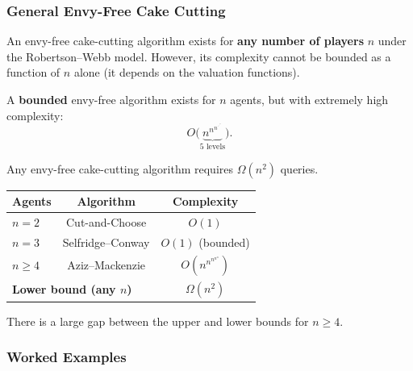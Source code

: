 \separator

\subsubsection{General Envy-Free Cake Cutting}

\begin{thmbox}
An envy-free cake-cutting algorithm exists for \textbf{any number of players} $n$ under the Robertson--Webb model. However, its complexity cannot be bounded as a function of $n$ alone (it depends on the valuation functions).
\end{thmbox}

\begin{thmbox}
A \textbf{bounded} envy-free algorithm exists for $n$ agents, but with extremely high complexity:
\[
  O\!\bigl(\underbrace{n^{n^{n^{\cdot^{\cdot^{\cdot^n}}}}}}_{5 \text{ levels}}\bigr).
\]
\end{thmbox}

\begin{thmbox}
Any envy-free cake-cutting algorithm requires $\Omega(n^2)$ queries.
\end{thmbox}

\begin{tipbox}
\begin{center}
\begin{tabular}{lcc}
\toprule
\textbf{Agents} & \textbf{Algorithm} & \textbf{Complexity} \\
\midrule
$n = 2$ & Cut-and-Choose & $O(1)$ \\
$n = 3$ & Selfridge--Conway & $O(1)$ (bounded) \\
$n \ge 4$ & Aziz--Mackenzie & $O(n^{n^{n^{n^n}}})$ \\
\midrule
\multicolumn{2}{l}{\textbf{Lower bound (any $n$)}} & $\Omega(n^2)$ \\
\bottomrule
\end{tabular}
\end{center}
There is a large gap between the upper and lower bounds for $n \ge 4$.
\end{tipbox}

\bigseparator

\subsubsection{Worked Examples}

